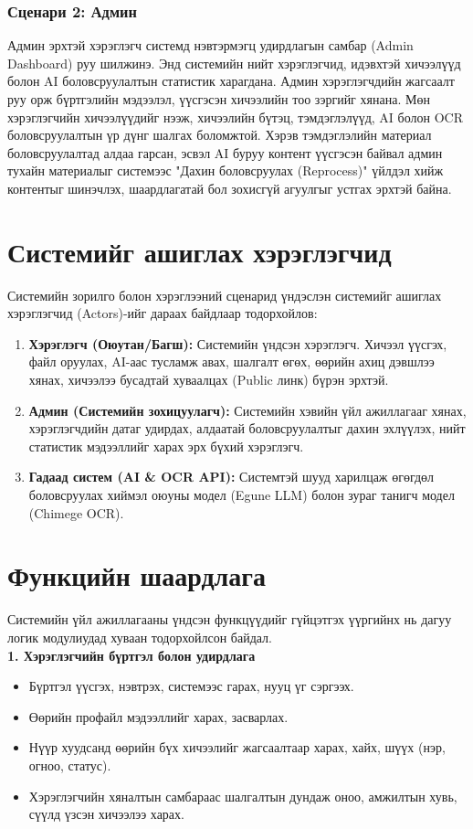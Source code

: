 \subsubsection{Сценари 2: Админ}
Админ эрхтэй хэрэглэгч системд нэвтэрмэгц удирдлагын самбар (Admin Dashboard) руу шилжинэ. Энд системийн нийт хэрэглэгчид, идэвхтэй хичээлүүд болон AI боловсруулалтын статистик харагдана. Админ хэрэглэгчдийн жагсаалт руу орж бүртгэлийн мэдээлэл, үүсгэсэн хичээлийн тоо зэргийг хянана. Мөн хэрэглэгчийн хичээлүүдийг нээж, хичээлийн бүтэц, тэмдэглэлүүд, AI болон OCR боловсруулалтын үр дүнг шалгах боломжтой. Хэрэв тэмдэглэлийн материал боловсруулалтад алдаа гарсан, эсвэл AI буруу контент үүсгэсэн байвал админ тухайн материалыг системээс "Дахин боловсруулах (Reprocess)" үйлдэл хийж контентыг шинэчлэх, шаардлагатай бол зохисгүй агуулгыг устгах эрхтэй байна.

\section{Системийг ашиглах хэрэглэгчид}
Системийн зорилго болон хэрэглээний сценарид үндэслэн системийг ашиглах хэрэглэгчид (Actors)-ийг дараах байдлаар тодорхойлов:
\begin{enumerate}
    \item \textbf{Хэрэглэгч (Оюутан/Багш):} Системийн үндсэн хэрэглэгч. Хичээл үүсгэх, файл оруулах, AI-аас тусламж авах, шалгалт өгөх, өөрийн ахиц дэвшлээ хянах, хичээлээ бусадтай хуваалцах (Public линк) бүрэн эрхтэй.
    \item \textbf{Админ (Системийн зохицуулагч):} Системийн хэвийн үйл ажиллагааг хянах, хэрэглэгчдийн датаг удирдах, алдаатай боловсруулалтыг дахин эхлүүлэх, нийт статистик мэдээллийг харах эрх бүхий хэрэглэгч.
    \item \textbf{Гадаад систем (AI \& OCR API):} Системтэй шууд харилцаж өгөгдөл боловсруулах хиймэл оюуны модел (Egune LLM) болон зураг танигч модел (Chimege OCR).
\end{enumerate}

\section{Функцийн шаардлага}
Системийн үйл ажиллагааны үндсэн функцүүдийг гүйцэтгэх үүргийнх нь дагуу логик модулиудад хуваан тодорхойлсон байдал. \\

\textbf{1. Хэрэглэгчийн бүртгэл болон удирдлага}
\begin{itemize}
    \item Бүртгэл үүсгэх, нэвтрэх, системээс гарах, нууц үг сэргээх.
    \item Өөрийн профайл мэдээллийг харах, засварлах.
    \item Нүүр хуудсанд өөрийн бүх хичээлийг жагсаалтаар харах, хайх, шүүх (нэр, огноо, статус).
    \item Хэрэглэгчийн хяналтын самбараас шалгалтын дундаж оноо, амжилтын хувь, сүүлд үзсэн хичээлээ харах.
\end{itemize}

